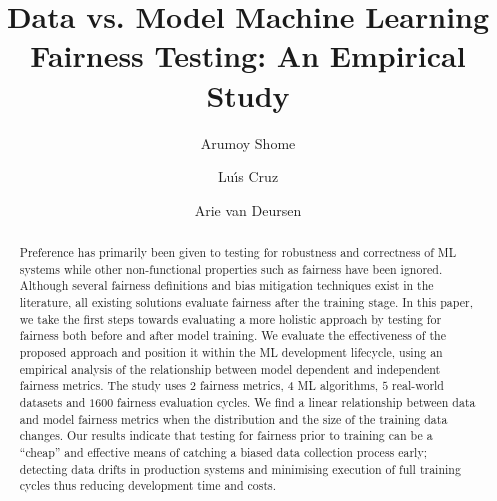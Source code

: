 \documentclass[sigconf,review,anonymous]{acmart}
\begin{document}
\title{Data vs. Model Machine Learning Fairness Testing: An Empirical Study}


\author{Arumoy Shome}

\author{Lu{\'\i}s Cruz}

\author{Arie van Deursen}


\begin{abstract}

  Preference has primarily been given to testing for robustness and
  correctness of ML systems while other non-functional properties such
  as fairness have been ignored. Although several fairness definitions
  and bias mitigation techniques exist in the literature, all existing
  solutions evaluate fairness after the training stage. In this paper,
  we take the first steps towards evaluating a more holistic approach
  by testing for fairness both before and after model training. We
  evaluate the effectiveness of the proposed approach and position it
  within the ML development lifecycle, using an empirical analysis of
  the relationship between model dependent and independent fairness
  metrics. The study uses $2$ fairness metrics, $4$ ML algorithms, $5$
  real-world datasets and $1600$ fairness evaluation cycles. We find a
  linear relationship between data and model fairness metrics when the
  distribution and the size of the training data changes. Our results
  indicate that testing for fairness prior to training can be a
  ``cheap'' and effective means of catching a biased data collection
  process early; detecting data drifts in production systems and
  minimising execution of full training cycles thus reducing
  development time and costs.

\end{abstract}

\maketitle
\end{document}

